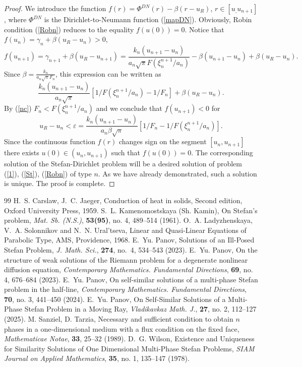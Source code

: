 \documentclass[10pt,a4paper]{amsart}
\numberwithin{equation}{section}
\begin{document}
\begin{proof}
We introduce the function $f(r)=\Phi^{DN}(r)-\beta(r-u_R)$, $r\in [u_,u_{n+1}]$, where $\Phi^{DN}$ is the Dirichlet-to-Neumann function (\ref{mapDN}). Obviously, Robin condition (\ref{Robn}) reduces to the equality
$f(u(0))=0$. Notice that $f(u_n)=\gamma_n+\beta(u_R-u_n)>0$,
\[f(u_{n+1})=\gamma_{n+1}+\beta(u_R-u_{n+1})=\frac{k_n(u_{n+1}-u_n)}{a_n\sqrt{\pi}F(\xi^{n+1}_n/a_n)}-\beta(u_{n+1}-u_n)+\beta(u_R-u_n).\]
Since $\beta=\frac{k_n}{a_n\sqrt{\pi}F_n}$, this expression can be written as
\[\frac{k_n(u_{n+1}-u_n)}{a_n\sqrt{\pi}}[1/F(\xi^{n+1}_n/a_n)-1/F_n]+\beta(u_R-u_n).\]
By (\ref{nc}) $F_n<F(\xi^{n+1}_n/a_n)$ and we conclude that $f(u_{n+1})<0$ for
\[u_R-u_n<\varepsilon=\frac{k_n(u_{n+1}-u_n)}{a_n\beta\sqrt{\pi}}[1/F_n - 1/F(\xi^{n+1}_n/a_n)].\]
Since the continuous function $f(r)$ changes sign on the segment $[u_n,u_{n+1}]$ there exists
$u(0)\in (u_n,u_{n+1})$ such that $f(u(0))=0$. The corresponding solution of the Stefan-Dirichlet problem will be a desired solution of problem (\ref{1}), (\ref{St}), (\ref{Robn}) of type $n$. As we have already demonstrated, such a solution is unique. The proof is complete.
\end{proof}


\begin{thebibliography}{99}
 H.~S. Carslaw, J.~C. Jaeger, Conduction of heat in solids, Second edition, Oxford University Press, 1959.
 S.~L. Kamenomostskaya (Sh. Kamin), On Stefan's problem, {\it Mat. Sb. (N.S.)}, \textbf{53(95)}, no. 4, 489--514 (1961).
 O.~A. Ladyzhenskaya, V.~A. Solonnikov and N.~N. Ural'tseva, Linear and Quasi-Linear Equations of Parabolic Type, AMS, Providence, 1968.
 E.~Yu. Panov, Solutions of an Ill-Posed Stefan Problem, {\it J. Math. Sci.}, \textbf{274}, no.~4, 534--543 (2023).
 E.~Yu. Panov, On the structure of weak solutions of the Riemann problem for a degenerate nonlinear diffusion equation, {\it Contemporary Mathematics. Fundamental Directions}, \textbf{69}, no. 4, 676--684 (2023).
 E.~Yu. Panov, On self-similar solutions of a multi-phase Stefan problem in the half-line, {\it Contemporary Mathematics. Fundamental Directions}, \textbf{70}, no. 3, 441--450 (2024).
 E.~Yu. Panov, On Self-Similar Solutions of a Multi-Phase Stefan Problem in a Moving Ray, {\it Vladikavkaz Math. J.}, \textbf{27}, no. 2, 112--127 (2025).
 M. Sanziel, D. Tarzia, Necessary and sufficient condition to obtain $n$ phases in a one-dimensional medium with a flux condition on the fixed face, {\it Mathematicae Notae}, \textbf{33}, 25--32 (1989).
 D.~G. Wilson, Existence and Uniqueness for Similarity Solutions of One Dimensional Multi-Phase Stefan Problems, {\it SIAM Journal on Applied Mathematics}, \textbf{35}, no. 1, 135--147 (1978).
\end{thebibliography}
\end{document}
